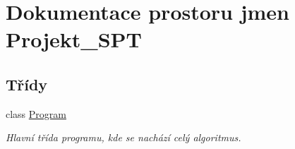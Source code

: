 \hypertarget{namespace_projekt___s_p_t}{}\section{Dokumentace prostoru jmen Projekt\+\_\+\+S\+PT}
\label{namespace_projekt___s_p_t}
\subsection*{Třídy}
\begin{DoxyCompactItemize}
\item 
class \mbox{\hyperlink{class_projekt___s_p_t_1_1_program}{Program}}
\begin{DoxyCompactList}\small\item\em Hlavní třída programu, kde se nachází celý algoritmus. \end{DoxyCompactList}\end{DoxyCompactItemize}

